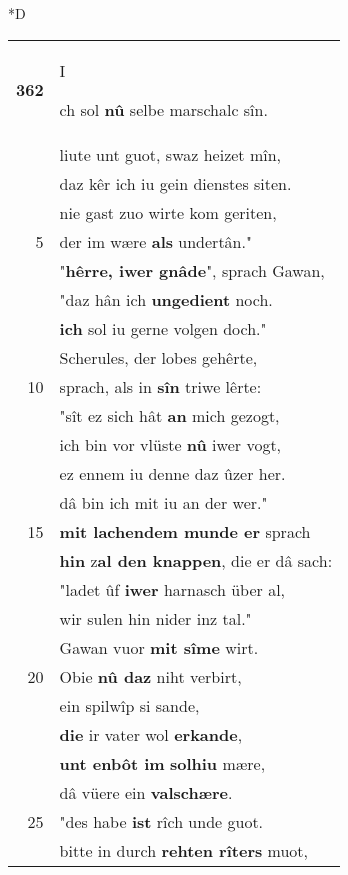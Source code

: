 \documentclass[8pt,a4paper,notitlepage]{article}
\begin{document}
\begin{table}[ht]
\begin{minipage}[t]{0.5\linewidth}
\small
\begin{center}*D
\end{center}
\begin{tabular}{rl}
\textbf{362} & \begin{large}I\end{large}ch sol \textbf{nû} selbe marschalc sîn.\\ 
 & liute unt guot, swaz heizet mîn,\\ 
 & daz kêr ich iu gein dienstes siten.\\ 
 & nie gast zuo wirte kom geriten,\\ 
5 & der im wære \textbf{als} undertân."\\ 
 & "\textbf{hêrre, iwer gnâde}", sprach Gawan,\\ 
 & "daz hân ich \textbf{ungedient} noch.\\ 
 & \textbf{ich} sol iu gerne volgen doch."\\ 
 & Scherules, der lobes gehêrte,\\ 
10 & sprach, als in \textbf{sîn} triwe lêrte:\\ 
 & "sît ez sich hât \textbf{an} mich gezogt,\\ 
 & ich bin vor vlüste \textbf{nû} iwer vogt,\\ 
 & ez ennem iu denne daz ûzer her.\\ 
 & dâ bin ich mit iu an der wer."\\ 
15 & \textbf{mit lachendem munde er} sprach\\ 
 & \textbf{hin} z\textbf{al den knappen}, die er dâ sach:\\ 
 & "ladet ûf \textbf{iwer} harnasch über al,\\ 
 & wir sulen hin nider inz tal."\\ 
 & Gawan vuor \textbf{mit sîme} wirt.\\ 
20 & Obie \textbf{nû daz} niht verbirt,\\ 
 & ein spilwîp si sande,\\ 
 & \textbf{die} ir vater wol \textbf{erkande},\\ 
 & \textbf{unt enbôt im} \textbf{solhiu} mære,\\ 
 & dâ vüere ein \textbf{valschære}.\\ 
25 & "des habe \textbf{ist} rîch unde guot.\\ 
 & bitte in durch \textbf{rehten rîters} muot,\\ 

\end{tabular}
\end{minipage}
\end{table}
\end{document}
